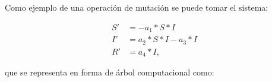 \begin{itemize}
\begin{center}
\begin{adjustbox}{width=0.25\textwidth, keepaspectratio}
%
              \end{adjustbox}
          \end{center}

\end{itemize}

Como ejemplo de una operación de mutación se puede tomar el sistema:

\begin{align*}
    S' & = - a_1 * S * I         \\
    I' & = a_2 * S * I - a_3 * I \\
    R' & = a_4 * I,
\end{align*}

que se representa en forma de árbol computacional como:

